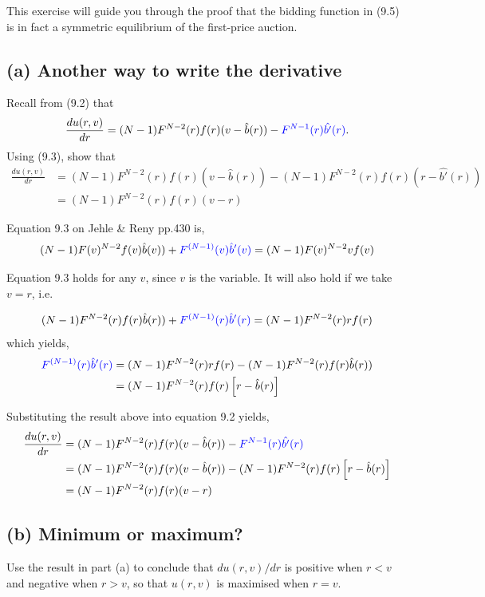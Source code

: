 \documentclass{article}
\begin{document}
This exercise will guide you through the proof that the bidding function in (9.5) is in fact a symmetric
equilibrium of the first-price auction.

\subsection*{(a) Another way to write the derivative} 

Recall from (9.2) that
$$\frac{du(r,v)}{dr}=(N-1)F^{N-2}(r)f(r)(v-\hat{b}(r))-\textcolor{blue}{F^{N-1}(r)\hat{b'}(r)}.$$
Using (9.3), show that
\begin{align*}
\frac{du(r,v)}{dr}&=(N-1)F^{N-2}(r)f(r)(v-\hat{b}(r))-(N-1)F^{N-2}(r)f(r)(r-\hat{b'}(r)) \\
&= (N-1)F^{N-2}(r)f(r)(v-r)
\end{align*}

\medskip

\begin{mdframed}[backgroundcolor=blue!20,linecolor=white]
Equation 9.3 on Jehle \& Reny pp.430 is,
$$(N-1)F(v)^{N-2}f(v)\hat{b}(v))+ \textcolor{blue}{F^{(N-1)}(v)\hat{b}'(v)} = (N-1)F(v)^{N-2}vf(v) $$
\end{mdframed}

Equation 9.3 holds for any $v$, since $v$ is the variable. It will also hold if we take $v=r$, i.e.

$$(N-1)F^{N-2}(r)f(r)\hat{b}(r))+ \textcolor{blue}{F^{(N-1)}(r)\hat{b}'(r)} = (N-1)F^{N-2}(r)rf(r) $$
which yields,
\begin{align*}
\textcolor{blue}{F^{(N-1)}(r)\hat{b}'(r)} &= (N-1)F^{N-2}(r)rf(r)-(N-1)F^{N-2}(r)f(r)\hat{b}(r)) \\
&=(N-1)F^{N-2}(r)f(r)\left[r - \hat{b}(r)\right]
\end{align*}

Substituting the result above into equation 9.2 yields,
\begin{align*}
\frac{du(r,v)}{dr}&=(N-1)F^{N-2}(r)f(r)(v-\hat{b}(r))-\textcolor{blue}{F^{N-1}(r)\hat{b'}(r)} \\
&=(N-1)F^{N-2}(r)f(r)(v-\hat{b}(r))-(N-1)F^{N-2}(r)f(r)\left[r - \hat{b}(r)\right] \\
&= (N-1)F^{N-2}(r)f(r)(v-r)
\end{align*}




\subsection*{(b) Minimum or maximum?}Use the result in part (a) to conclude that $du(r, v)/dr$ is positive when $r < v$ and negative when
$r > v$, so that $u(r, v)$ is maximised when $r = v$.
\end{document}
